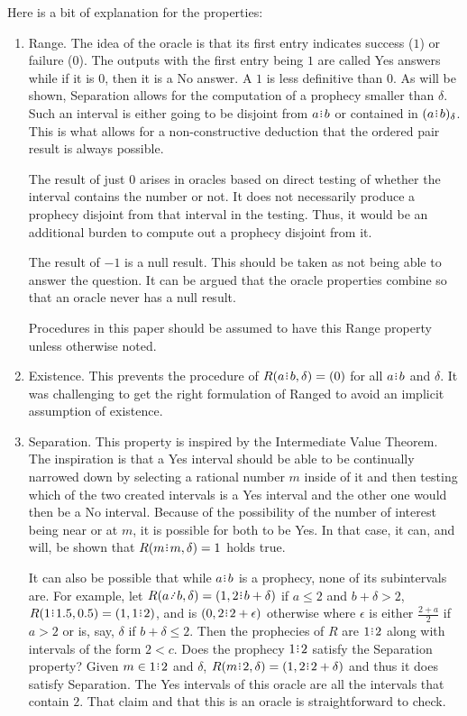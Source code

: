 \documentclass[12pt]{article}
\begin{document}
Here is a bit of explanation for the properties: 
\begin{enumerate}
    \item Range. The idea of the oracle is that its first entry indicates success ($1$) or failure ($0$). The outputs with the first entry being $1$ are called Yes answers while if it is $0$, then it is a No answer. A $1$ is less definitive than $0$. As will be shown, Separation allows for the computation of a prophecy smaller than $\delta$. Such an interval is either going to be disjoint from $a \rint b$ or contained in $\halo{a\rint b}$. This is what allows for a non-constructive deduction that the ordered pair result is always possible. 

    The result of just $0$ arises in oracles based on direct testing of whether the interval contains the number or not. It does not necessarily produce a prophecy disjoint from that interval in the testing. Thus, it would be an additional burden to compute out a prophecy disjoint from it. 

    The result of $-1$ is a null result. This should be taken as not being able to answer the question. It can be argued that the oracle properties combine so that an oracle never has a null result. 

    Procedures in this paper should be assumed to have this Range property unless otherwise noted. 

    \item Existence. This prevents the procedure of $R(a\rint b, \delta) = (0)$ for all $a\rint b$ and $\delta$. It was challenging to get the right formulation of Ranged to avoid an implicit assumption of existence. 

    \item Separation. This property is inspired by the Intermediate Value Theorem. The inspiration is that a Yes interval should be able to be continually narrowed down by selecting a rational number $m$ inside of it and then testing which of the two created intervals is a Yes interval and the other one would then be a No interval. Because of the possibility of the number of interest being near or at $m$, it is possible for both to be Yes. In that case, it can, and will, be shown that $R(m\rint m, \delta) = 1$ holds true. 
    
    It can also be possible that while $a\rint b$ is a prophecy, none of its subintervals are. For example, let $R(a \lte  b, \delta) = (1, 2\rint  b+ \delta)$ if $a \leq 2$ and $b + \delta > 2$,  $R(1\rint 1.5, 0.5) = (1, 1\rint 2)$, and is $(0, 2\rint 2+\epsilon)$ otherwise where $\epsilon$ is either $\frac{2+a}{2}$ if $a > 2$ or is, say, $\delta$ if $b+\delta \leq 2$. Then the prophecies of $R$ are  $1\rint 2$ along with intervals of the form $2 \lt  c$. Does the prophecy $1\rint 2$ satisfy the Separation property? Given $m \in 1\rint 2$ and $\delta$, $R(m \rint 2, \delta) = (1, 2\rint 2+\delta)$ and thus it does satisfy Separation. The Yes intervals of this oracle are all the intervals that contain $2$. That claim and that this is an oracle is straightforward to check.  
    

\end{enumerate}
\end{document}
